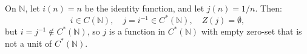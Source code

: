On $\mathbb{N}$, let $i(n) = n$ be the identity function, and let $j(n) = 1/n$. Then:
$$i \in C(\mathbb{N}), \quad j = i^{-1} \in C^*(\mathbb{N}), \quad Z(j) = \emptyset,$$
but $i = j^{-1} \notin C^*(\mathbb{N})$, so $j$ is a function in $C^*(\mathbb{N})$ with empty zero-set that is not a unit of $C^*(\mathbb{N})$.
